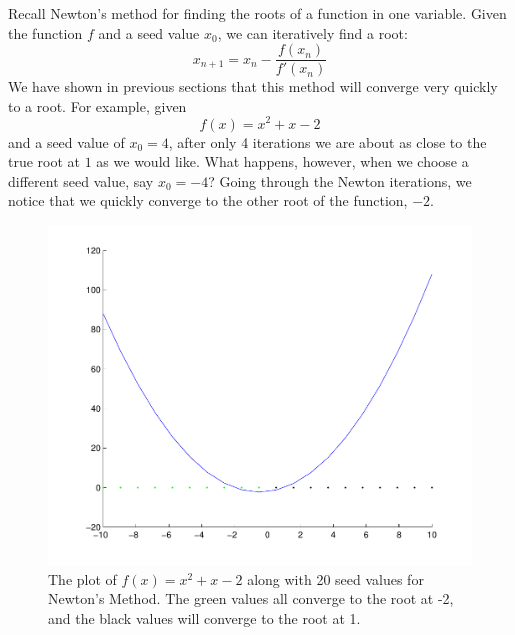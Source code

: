 


Recall Newton's method for finding the roots of a function in one variable.  Given the function $f$ and a seed value $x_0$, we can iteratively find a root:
\[
x_{n+1} = x_n - \frac{f(x_n)}{f'(x_n)}
\]
We have shown in previous sections that this method will converge very quickly to a root.  For example, given
\[
f(x) = x^2 + x -2
\]
and a seed value of $x_0 = 4$, after only 4 iterations we are about as close to the true root at $1$ as we would like.  What happens, however, when we choose a different seed value, say $x_0 = -4$?  Going through the Newton iterations, we notice that we quickly converge to the other root of the function, $-2$.

\begin{figure}\label{Fig:basins1}
\begin{center}
\includegraphics[scale=0.5]{./Figures/basins1}
\caption{The plot of $f(x) = x^2 + x - 2$ along with 20 seed values for Newton's Method.  The green values all converge to the root at -2, and the black values will converge to the root at 1.}
\end{center}
\end{figure}

